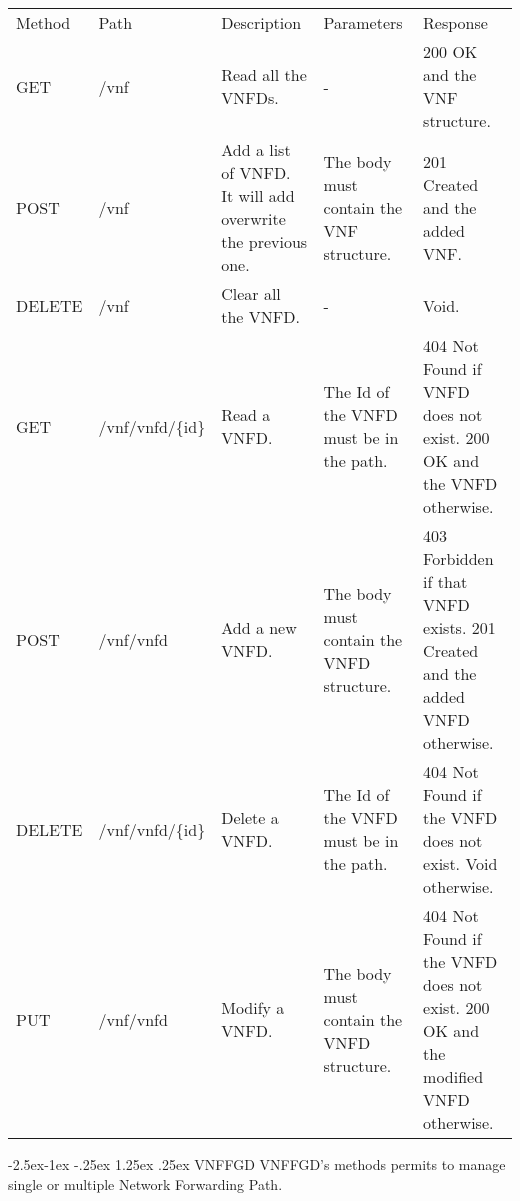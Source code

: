 \documentclass[11pt, english]{article}
\makeatletter
\renewcommand\paragraph{\@startsection{paragraph}{4}{\z@}%
            {-2.5ex\@plus -1ex \@minus -.25ex}%
            {1.25ex \@plus .25ex}%
            {\normalfont\normalsize\bfseries}}
\makeatother
\begin{document}
\begin{tabular}{ |p{2cm}|m{3cm}|p{3cm}|p{3cm}|p{4cm}| }
    \hline
    \rowcolor{black} \multicolumn{5}{|c|}{\textcolor{white}{VNF}} \\
    \hline
    \rowcolor{Gray}
    Method & Path & Description & Parameters & Response \\
    \hline
    GET   & /vnf & Read all the VNFDs. & - & 200 OK and the VNF structure. \\
    \hline
    POST & /vnf & Add a list of VNFD. It will add overwrite the previous one. & The body must contain the VNF structure. & 201 Created and the added VNF. \\
    \hline
    DELETE & /vnf & Clear all the VNFD. & - & Void. \\
    \hline
    GET & /vnf/vnfd/\{id\} & Read a VNFD. & The Id of the VNFD must be in the path. & 404 Not Found if VNFD does not exist. 200 OK and the VNFD otherwise. \\
    \hline
    POST & /vnf/vnfd & Add a new VNFD. & The body must contain the VNFD structure. & 403 Forbidden if that VNFD exists. 201 Created and the added VNFD otherwise. \\
    \hline
    DELETE & /vnf/vnfd/\{id\} & Delete a VNFD. & The Id of the VNFD must be in the path. & 404 Not Found if the VNFD does not exist. Void otherwise. \\
    \hline
    PUT & /vnf/vnfd & Modify a VNFD. & The body must contain the VNFD structure. & 404 Not Found if the VNFD does not exist. 200 OK and the modified VNFD otherwise. \\
    \hline
\end{tabular}

\newpage
\paragraph{VNFFGD}
VNFFGD's methods permits to manage single or multiple Network Forwarding Path. \\
\end{document}

